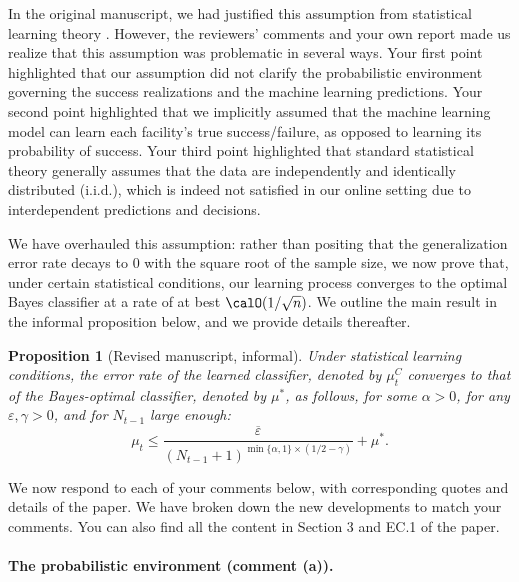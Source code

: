\documentclass[11pt]{article}
\newtheorem{proposition}{Proposition}[]
\begin{document}
In the original manuscript, we had justified this assumption from statistical learning theory \citep[using, for instance][]{chaudhuri2014rates,ng2001discriminative,mansour2000generalization,ng2001discriminative,gao2020towards}. However, the reviewers' comments and your own report made us realize that this assumption was problematic in several ways. Your first point highlighted that our assumption did not clarify the probabilistic environment governing the success realizations and the machine learning predictions. Your second point highlighted that we implicitly assumed that the machine learning model can learn each facility's true success/failure, as opposed to learning its probability of success. Your third point highlighted that standard statistical theory generally assumes that the data are independently and identically distributed (i.i.d.), which is indeed not satisfied in our online setting due to interdependent predictions and decisions.

We have overhauled this assumption: rather than positing that the generalization error rate decays to 0 with the square root of the sample size, we now prove that, under certain statistical conditions, our learning process converges to the optimal Bayes classifier at a rate of at best $\calO(1/\sqrt{n})$. We outline the main result in the informal proposition below, and we provide details thereafter.
\setcounter{proposition}{0}
\begin{proposition}[Revised manuscript, informal]\label{prop:MLE_informal_AE}
   Under statistical learning conditions, the error rate of the learned classifier, denoted by $\mu_t^C$ converges to that of the Bayes-optimal classifier, denoted by $\mu^*$, as follows, for some $\alpha>0$, for any $\varepsilon,\gamma>0$, and for $N_{t-1}$ large enough:
    \[\mu_t \leq \frac{\overline\varepsilon}{(N_{t-1}+1)^{\min\{\alpha,1\}\times (1/2-\gamma)}}+\mu^*.\]
\end{proposition}

We now respond to each of your comments below, with corresponding quotes and details of the paper. We have broken down the new developments to match your comments. You can also find all the content in Section 3 and EC.1 of the paper.

\paragraph{The probabilistic environment (comment (a)).}\
\end{document}
